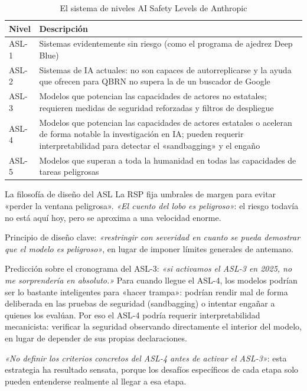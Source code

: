 \begin{table}[H]
\centering
\begin{tabular}{lp{9cm}}
\toprule
\textbf{Nivel} & \textbf{Descripción} \\
\midrule
ASL-1 & Sistemas evidentemente sin riesgo (como el programa de ajedrez Deep Blue) \\
ASL-2 & Sistemas de IA actuales: no son capaces de autorreplicarse y la ayuda que ofrecen para QBRN no supera la de un buscador de Google \\
ASL-3 & Modelos que potencian las capacidades de actores no estatales; requieren medidas de seguridad reforzadas y filtros de despliegue \\
ASL-4 & Modelos que potencian las capacidades de actores estatales o aceleran de forma notable la investigación en IA; pueden requerir interpretabilidad para detectar el «sandbagging» y el engaño \\
ASL-5 & Modelos que superan a toda la humanidad en todas las capacidades de tareas peligrosas \\
\bottomrule
\end{tabular}
\caption{El sistema de niveles AI Safety Levels de Anthropic}
\end{table}

\begin{importantbox}{La filosofía de diseño del ASL}
La RSP fija umbrales de margen para evitar «perder la ventana peligrosa». \textit{«El cuento del lobo es peligroso»}: el riesgo todavía no está aquí hoy, pero se aproxima a una velocidad enorme.

Principio de diseño clave: \textit{«restringir con severidad en cuanto se pueda demostrar que el modelo es peligroso»}, en lugar de imponer límites generales de antemano.
\end{importantbox}

Predicción sobre el cronograma del ASL-3: \textit{«si activamos el ASL-3 en 2025, no me sorprendería en absoluto.»} Para cuando llegue el ASL-4, los modelos podrían ser lo bastante inteligentes para «hacer trampa»: podrían rendir mal de forma deliberada en las pruebas de seguridad (sandbagging) o intentar engañar a quienes los evalúan. Por eso el ASL-4 podría requerir interpretabilidad mecanicista: verificar la seguridad observando directamente el interior del modelo, en lugar de depender de sus propias declaraciones.

\textit{«No definir los criterios concretos del ASL-4 antes de activar el ASL-3»}: esta estrategia ha resultado sensata, porque los desafíos específicos de cada etapa solo pueden entenderse realmente al llegar a esa etapa.

